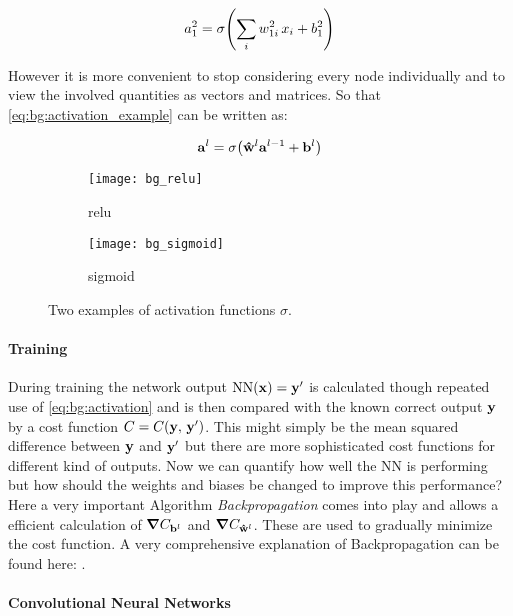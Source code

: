 \begin{equation} \label{eq:bg:activation_example}
    a^2_1 = \sigma \qty(\sum_i w^2_{1i} \, x_i + b^2_1)
\end{equation}

\noindent
However it is more convenient to stop considering every node individually and to view the involved quantities as vectors and matrices. So that \eqref{eq:bg:activation_example} can be written as:

\begin{equation} \label{eq:bg:activation}
    \vb{a}^l = \sigma \qty(\vu{w}^l \vb{a}^{l-1} + \vb{b}^l)
\end{equation}

\begin{figure}[H]
\centering
\begin{subfigure}{.5\textwidth}
    \centering
    \texttt{[image: bg\_relu]}
    \caption{relu}
    \label{}
\end{subfigure}%
\begin{subfigure}{.5\textwidth}
    \centering
    \texttt{[image: bg\_sigmoid]}
    \caption{sigmoid}
    \label{}
\end{subfigure}
\caption{Two examples of activation functions $\sigma$.}
\label{}
\end{figure}

\paragraph{Training}
During training the network output $\mathrm{NN}(\vb x) = \vb{y}' $ is calculated though repeated use of \eqref{eq:bg:activation} and is then compared with the known correct output $\vb y$ by a cost function $C = C(\vb y, \, \vb y')$. This might simply be the mean squared difference between $\vb y$ and $\vb y'$ but there are more sophisticated cost functions for different kind of outputs. Now we can quantify how well the NN is performing but how should the weights and biases be changed to improve this performance?
Here a very important Algorithm \textit{Backpropagation} comes into play and allows a efficient calculation of $\grad{C}_{\vb{b}^l}$ and $\grad{C}_{\vu{w}^l}$. These are used to gradually minimize the cost function. A very comprehensive explanation of Backpropagation can be found here: \cite{backprop}.

\paragraph{Convolutional Neural Networks}
